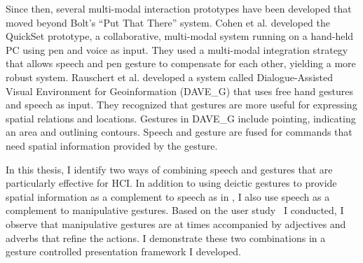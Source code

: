 Since then, several multi-modal interaction prototypes have been
developed that moved beyond Bolt's ``Put That There'' system. Cohen et al. 
\cite{Cohen97} developed the QuickSet prototype, a collaborative, 
multi-modal system running on a hand-held PC using pen and voice as input. They 
used a multi-modal integration strategy that allows speech and pen gesture 
to compensate for each other, yielding a more robust system. Rauschert et al. 
\cite{Rauschert02} developed a system called Dialogue-Assisted Visual 
Environment for Geoinformation (DAVE\_G) that uses free hand gestures and speech
as input. They recognized that gestures are more useful for expressing spatial 
relations and locations. Gestures in DAVE\_G include pointing, indicating an 
area and outlining contours. Speech and gesture are fused for commands that need
spatial information provided by the gesture. 

In this thesis, I identify two ways of combining speech and gestures that are
particularly effective for HCI.
In addition to using deictic gestures to provide spatial information as a
complement to speech as in \cite{Rauschert02}, I also use speech as a
complement to manipulative gestures.
Based on the user study~\cite{yin10} I
conducted, I observe that manipulative gestures are at times accompanied by
adjectives and adverbs that refine the actions. I demonstrate these two
combinations in a gesture controlled presentation framework I developed.
